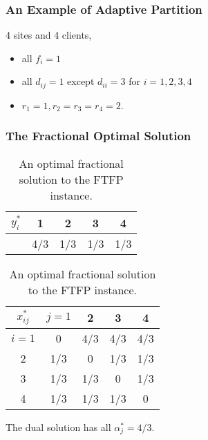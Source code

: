 \documentclass[hyperref, xcolor=dvipsnames]{beamer}
\begin{document}
\begin{frame}
  \frametitle{An Example of Adaptive Partition}
  4 sites and 4 clients,
  \begin{itemize}
  \item all $f_i=1$
  \item all $d_{ij}=1$ except $d_{ii} = 3$ for $i=1,2,3,4$
  \item $r_1 = 1, r_2 = r_3 = r_4 = 2$.
  \end{itemize}
\end{frame}

\begin{frame}
  \frametitle{The Fractional Optimal Solution}
  \begin{table}
    \begin{subtable}{0.5\textwidth}
      \centering
      \begin{tabular}{c | c c c c}
        $y_i^\ast$ & 1 & 2 & 3 & 4\\
        \hline
        & 4/3 & 1/3 & 1/3 & 1/3\\
      \end{tabular}
      \subcaption{}
    \end{subtable}
%
    \begin{subtable}{0.5\textwidth}
      \centering
      \begin{tabular}{c | c c c c}
        $x_{ij}^\ast$ & $j=1$ & 2 & 3 & 4\\
        \hline
        $i=1$ & 0 & 4/3 & 4/3 & 4/3\\
        2 & 1/3 & 0 & 1/3 & 1/3\\
        3 & 1/3 & 1/3 & 0 & 1/3\\
        4 & 1/3 & 1/3 & 1/3 & 0\\
      \end{tabular}
      \subcaption{}
    \end{subtable}
    \caption{An optimal fractional solution to the FTFP instance.}
\end{table}

The dual solution has all $\alpha_j^\ast = 4/3$.
\end{frame}
\end{document}
